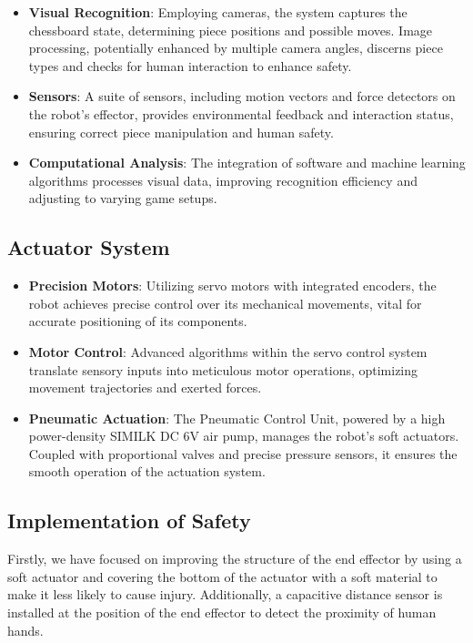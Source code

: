 \documentclass[10pt, a4paper, twocolumn]{article}
\begin{document}
\begin{itemize}
    \item \textbf{Visual Recognition}: Employing cameras, the system captures the chessboard state, determining piece positions and possible moves. Image processing, potentially enhanced by multiple camera angles, discerns piece types and checks for human interaction to enhance safety.
    \item \textbf{Sensors}: A suite of sensors, including motion vectors and force detectors on the robot's effector, provides environmental feedback and interaction status, ensuring correct piece manipulation and human safety.
    \item \textbf{Computational Analysis}: The integration of software and machine learning algorithms processes visual data, improving recognition efficiency and adjusting to varying game setups.
\end{itemize}

\subsection{Actuator System}

\begin{itemize}
    \item \textbf{Precision Motors}: Utilizing servo motors with integrated encoders, the robot achieves precise control over its mechanical movements, vital for accurate positioning of its components.
    \item \textbf{Motor Control}: Advanced algorithms within the servo control system translate sensory inputs into meticulous motor operations, optimizing movement trajectories and exerted forces.
    \item \textbf{Pneumatic Actuation}: The Pneumatic Control Unit, powered by a high power-density SIMILK DC 6V air pump, manages the robot's soft actuators. Coupled with proportional valves and precise pressure sensors, it ensures the smooth operation of the actuation system.
\end{itemize}

\subsection{Implementation of Safety}
Firstly, we have focused on improving the structure of the end effector by using a soft actuator and covering the bottom of the actuator with a soft material to make it less likely to cause injury. Additionally, a capacitive distance sensor is installed at the position of the end effector to detect the proximity of human hands.
\end{document}
